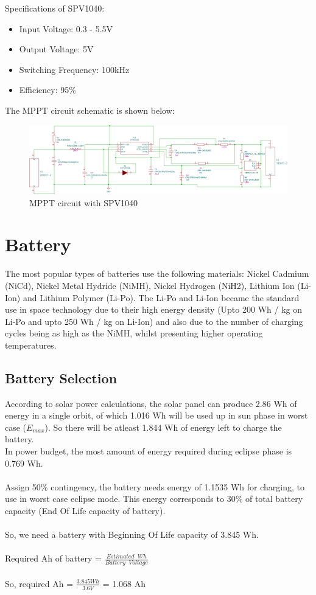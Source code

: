 Specifications of  SPV1040:
	\begin{itemize}
	\item Input Voltage: 0.3 - 5.5V
	\item Output Voltage: 5V
	\item Switching Frequency: 100kHz
	\item Efficiency: 95\%
\end{itemize}
The MPPT circuit schematic is shown below:
 	\begin{figure}[h]
	\centering
	\includegraphics[width=\columnwidth]{IMGS/MpptDemoBoard.pdf}
	\caption{MPPT circuit with SPV1040}
	\label{fig:mpptsch}
\end{figure}

\section[Battery]{Battery}
The most popular types of batteries use the following materials: Nickel Cadmium
(NiCd), Nickel Metal Hydride (NiMH), Nickel Hydrogen (NiH2), Lithium Ion
(Li-Ion) and Lithium Polymer (Li-Po). The Li-Po and Li-Ion became the standard use in space technology due to their
high energy density (Upto 200 Wh / kg on Li-Po and upto 250 Wh / kg on Li-Ion) and also due to
the number of charging cycles being as high as the NiMH, whilst presenting higher
operating temperatures. 
\subsection{Battery Selection}
According to solar power calculations, the solar panel can produce 2.86 Wh of energy in a single orbit, of which 1.016 Wh will be used up in sun phase in worst case ($E_{max}$). So there will be atleast 1.844 Wh of energy left to charge the battery.\\
In power budget, the most amount of energy required during eclipse phase is 0.769 Wh.\\ \\
Assign 50\% contingency, the battery needs energy of 1.1535 Wh for charging, to use in worst case eclipse mode. This energy corresponds to 30\% of total battery capacity (End Of Life capacity of battery).\\ \\
So, we need a battery with Beginning Of Life capacity of 3.845 Wh.\\ \\
\hspace*{5cm}Required Ah of battery = $\frac{Estimated\;\; Wh}{Battery\;\; Voltage}$
\\ \\ \hspace*{5cm}So, required Ah = $\frac{3.845 Wh}{3.6 V}$ = 1.068 Ah\\


